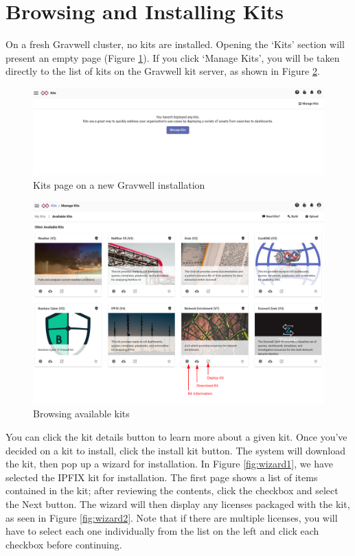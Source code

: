 \section{Browsing and Installing Kits}

On a fresh Gravwell cluster, no kits are installed. Opening the `Kits' section will present an empty page (Figure \ref{fig:blank-kits}). If you click `Manage Kits', you will be taken directly to the list of kits on the Gravwell kit server, as shown in Figure \ref{fig:available-kits}.

\begin{figure}[H]
	\includegraphics[width=0.8\linewidth]{images/blank-kits.png}
	\caption{Kits page on a new Gravwell installation}
	\label{fig:blank-kits}
\end{figure}

\begin{figure}[H]
	\includegraphics[width=0.8\linewidth]{images/available-kits.png}
	\caption{Browsing available kits}
	\label{fig:available-kits}
\end{figure}

You can click the kit details button to learn more about a given kit. Once you've decided on a kit to install, click the install kit button. The system will download the kit, then pop up a wizard for installation. In Figure \ref{fig:wizard1}, we have selected the IPFIX kit for installation. The first page shows a list of items contained in the kit; after reviewing the contents, click the checkbox and select the Next button. The wizard will then display any licenses packaged with the kit, as seen in Figure \ref{fig:wizard2}. Note that if there are multiple licenses, you will have to select each one individually from the list on the left and click each checkbox before continuing.

